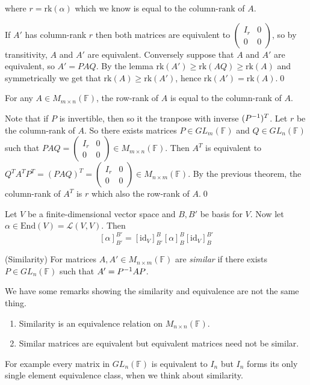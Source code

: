 \documentclass{article}
\newcommand{\F}{\mathbb{F}}
\newcommand{\rk}{\mathrm{rk}}
\begin{document}
where $ r=\rk(\alpha) $ which we know is equal to the column-rank of $ A $.\par
If $ A' $ has column-rank $ r $ then both matrices are equivalent to $ \begin{pmatrix}
	I_r&0\\0 &0
\end{pmatrix} $, so by transitivity, $ A $ and $ A' $ are equivalent. Conversely suppose that $ A $ and $ A' $ are equivalent, so $ A'=PAQ $. By the lemma $ \rk(A')\ge \rk(AQ)\ge\rk(A) $ and symmetrically we get that $ \rk(A)\ge \rk(A') $, hence $ \rk(A')=\rk(A) $.\qed
\begin{theorem}
	For any $ A\in M_{m\times n}(\F) $, the row-rank of $ A $ is equal to the column-rank of $ A $.
\end{theorem}
\pf Note that if $ P $ is invertible, then so it the tranpose with inverse $ ({P}^{-1})^T $. Let $ r $ be the column-rank of $ A $. So there exists matrices $ P\in GL_m(\F) $ and $ Q\in GL_n(\F) $ such that $ PAQ=\begin{pmatrix}
	I_r&0\\ 0 & 0
\end{pmatrix}\in M_{m\times n}(\F) $. Then $ A^T $ is equivalent to $ Q^TA^TP^T=(PAQ)^T=\begin{pmatrix}
	I_r & 0 \\ 0 & 0
\end{pmatrix} \in M_{n\times m}(\F)$. By the previous theorem, the column-rank of $ A^T $ is $ r $ which also the row-rank of $ A $.\qed\par
Let $ V $ be a finite-dimensional vector space and $ B,B' $ be basis for $ V $. Now let $ \alpha\in\mathrm{End}(V)=\mathcal L(V,V) $. Then
\[
	[\alpha]^{B'}_{B'}=[\mathrm{id}_V]^B_{B'}[\alpha]^B_B[\mathrm{id}_V]^{B'}_B
\]
\begin{definition}
	(Similarity) For matrices $ A,A'\in M_{n\times m}(\F) $ are \textit{similar} if there exists $ P\in GL_n(\F) $ such that $ A'={P}^{-1} AP $.
\end{definition}
\begin{remark}
We have some remarks showing the similarity and equivalence are not the same thing.
\begin{enumerate}
	\item Similarity is an equivalence relation on $ M_{n\times n}(\F) $.
	\item Similar matrices are equivalent but equivalent matrices need not be similar.
\end{enumerate}
For example every matrix in $ GL_n(\F) $ is equivalent to $ I_n $ but $ I_n $ forms its only single element equivalence class, when we think about similarity.
\end{remark}
\end{document}

